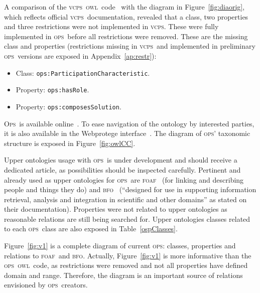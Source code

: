 \documentclass[10pt,letterpaper]{article}
\newcommand{\ops}{\textsc{ops}}
\newcommand{\opsi}{O\textsc{ps}}
\newcommand{\vcps}{\textsc{vcps}}
\newcommand{\owl}{\textsc{owl}}
\newcommand{\bfo}{\textsc{bfo}}
\newcommand{\foaf}{\textsc{foaf}}
\begin{document}
A comparison of the \vcps\ \owl\ code~\cite{owlCCPtg} 
with the diagram in Figure~\ref{fig:diaorig}, which reflects official \vcps\ documentation,
revealed that a class, two properties and three restrictions were not implemented in \vcps.
These were fully implemented in \ops\ before all restrictions were removed.
These are the missing class and properties 
(restrictions missing in \vcps\ and implemented in preliminary \ops\ versions are exposed in Appendix~\ref{ap:restr}):
\begin{itemize}
    \item Class: {\tt    ops:ParticipationCharacteristic}.
    \item Property: {\tt ops:hasRole}.
    \item Property: {\tt ops:composesSolution}.
\end{itemize}

\opsi\ is available online~\cite{owlOSP}.
To ease navigation of the ontology by interested parties,
it is also available in the Webprotege interface~\cite{owlOSPwp}.
The diagram of \ops ' taxonomic structure is exposed in Figure~\ref{fig:owlCC}.

Upper ontologies usage with \ops\ is under development and should receive a dedicated article,
as possibilities should be inspected carefully.
Pertinent and already used as upper ontologies for \ops\ are \foaf~\cite{foaf}
(for linking and describing people and things they do) and \bfo~\cite{bfo}
(``designed for use in supporting information retrieval, analysis and integration in scientific and other domains''
as stated on their documentation).
Properties were not related to upper ontologies as reasonable relations are still being searched for.
Upper ontologies classes related to each \ops\ class are also exposed in Table~\ref{ospClasses}.

Figure~\ref{fig:v1} is a complete diagram of current \ops:
classes, properties and relations to \foaf\ and \bfo.
Actually, Figure~\ref{fig:v1} is more informative than the \ops\ \owl\ code,
as restrictions were removed and not all properties have defined domain and range.
Therefore, the diagram is an important source of relations envisioned by \ops\ creators.
\end{document}
